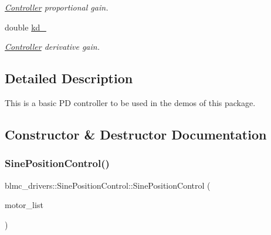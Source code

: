 \begin{DoxyCompactItemize}
\begin{DoxyCompactList}\small\item\em \hyperlink{classController}{Controller} proportional gain. \end{DoxyCompactList}\item 
\mbox{\label{classblmc__drivers_1_1SinePositionControl_ab48d1f5927551b7856474b92a84859e9}} 
double \hyperlink{classblmc__drivers_1_1SinePositionControl_ab48d1f5927551b7856474b92a84859e9}{kd\+\_\+}
\begin{DoxyCompactList}\small\item\em \hyperlink{classController}{Controller} derivative gain. \end{DoxyCompactList}\end{DoxyCompactItemize}


\subsection{Detailed Description}
This is a basic PD controller to be used in the demos of this package. 

\subsection{Constructor \& Destructor Documentation}
\mbox{\label{classblmc__drivers_1_1SinePositionControl_a6f5a006338c7975f9aeef5987384c661}} 
\subsubsection{\texorpdfstring{Sine\+Position\+Control()}{SinePositionControl()}}
{\footnotesize\ttfamily blmc\+\_\+drivers\+::\+Sine\+Position\+Control\+::\+Sine\+Position\+Control (\begin{DoxyParamCaption}\item[{std\+::vector$<$ \hyperlink{namespaceblmc__drivers_ab975c3be3c53a93a10c491f07a132e2b}{Safe\+Motor\+\_\+ptr} $>$}]{motor\+\_\+list }\end{DoxyParamCaption})\hspace{0.3cm}{\ttfamily [inline]}}



